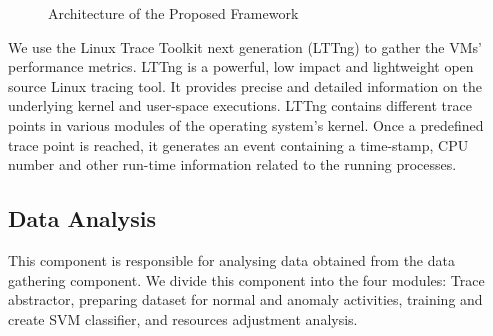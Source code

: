 \documentclass[twocolumn]{bmcart}%
\begin{document}
\begin{figure}[!ht]
    \center
	\vspace{2mm}
    \label{fig1}
    \caption{Architecture of the Proposed Framework}
\end{figure}

We use the Linux Trace Toolkit next generation (LTTng) \cite{desnoyers2006lttng} to gather the VMs' performance metrics. LTTng is a powerful, low impact and lightweight \cite{ezzati2012stateful} open source Linux tracing tool. It provides precise and detailed information on the underlying kernel and user-space executions. LTTng contains different trace points in various modules of the operating system's kernel. Once a predefined trace point is reached, it generates an event containing a time-stamp, CPU number and other run-time information related to the running processes.


\subsection*{Data Analysis}
This component is responsible for analysing data obtained from the data gathering component. We divide this component into the four modules: Trace abstractor, preparing dataset for normal and anomaly activities, training and create SVM classifier, and resources adjustment analysis.
\end{document}
